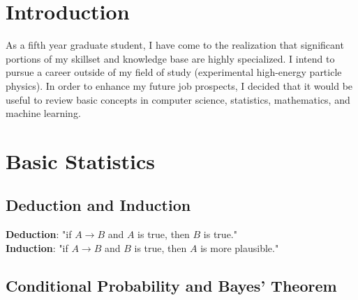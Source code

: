 \documentclass[
10pt, %
a4paper, %
oneside, %
headinclude,footinclude, %
BCOR5mm, %
]{scrartcl}
\begin{document}
{\let\thefootnote\relax{}}


\newpage %


\section{Introduction}

As a fifth year graduate student, I have come to the realization that significant portions of my skillset and knowledge base are highly specialized. I intend to pursue a career outside of my field of study (experimental high-energy particle physics). In order to enhance my future job prospects, I decided that it would be useful to review basic concepts in computer science, statistics, mathematics, and machine learning.


\section{Basic Statistics}

\subsection{Deduction and Induction}

\textbf{Deduction}: "if $A \rightarrow B$ and $A$ is true, then $B$ is true." \\
\textbf{Induction}: "if $A \rightarrow B$ and $B$ is true, then $A$ is more plausible." \\

\subsection{Conditional Probability and Bayes' Theorem}
\end{document}
